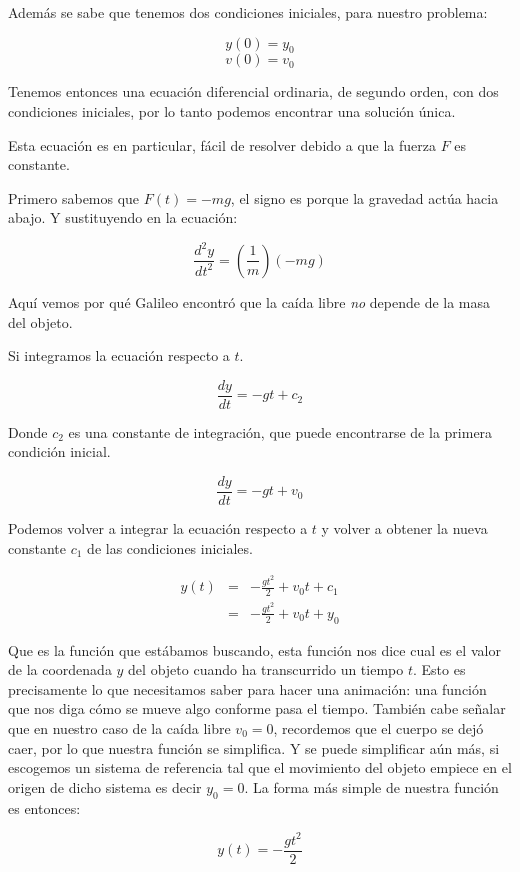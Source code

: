 Además se sabe que tenemos dos condiciones iniciales, para nuestro problema:

$$ y(0) = y_0 $$
$$ v(0) = v_0 $$

Tenemos entonces una ecuación diferencial ordinaria, de segundo orden, con dos condiciones iniciales, por lo tanto podemos encontrar una solución única.

Esta ecuación es en particular, fácil de resolver debido a que la fuerza $F$ es constante.

Primero sabemos que $F(t) = -mg$, el signo es porque la gravedad actúa hacia abajo.
Y sustituyendo en la ecuación:

\begin{equation}
\label{fuerzaGravedad}
\frac{d^2y}{dt^2} = \left(\frac{1}{m}\right)\left( -mg \right) 
\end{equation}

Aquí vemos por qué Galileo encontró que la caída libre \emph{no} depende de la masa del objeto.

Si integramos la ecuación respecto a $t$.

$$ \frac{dy}{dt} = -gt + c_2 $$

Donde $c_2$ es una constante de integración, que puede encontrarse de la primera condición inicial.

$$ \frac{dy}{dt} = -gt + v_0 $$

Podemos volver a integrar la ecuación respecto a $t$ y volver a obtener la nueva constante $c_1$ de las condiciones iniciales.

\begin{eqnarray}
 y(t) & = & -\frac{gt^2}{2} + v_0t + c_1 \nonumber \\
      & = & -\frac{gt^2}{2} + v_0t + y_0
\end{eqnarray}

Que es la función que estábamos buscando, esta función nos dice cual es el valor de la coordenada $y$ del objeto cuando ha transcurrido un tiempo $t$.
Esto es precisamente lo que necesitamos saber para hacer una animación: una función que nos diga cómo se mueve algo conforme pasa el tiempo.
También cabe señalar que en nuestro caso de la caída libre $v_0 = 0$, recordemos que el cuerpo se dejó caer, por lo que nuestra función se simplifica.
Y se puede simplificar aún más, si escogemos un sistema de referencia tal que el movimiento del objeto empiece en el origen de dicho sistema es decir $y_0 = 0$.
La forma más simple de nuestra función es entonces:

\begin{equation}
 y(t) = -\frac{gt^2}{2}
\end{equation}

